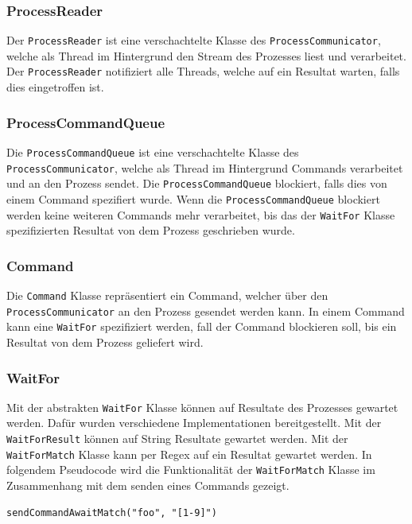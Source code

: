 \subsubsection{ProcessReader}

Der \verb!ProcessReader! ist eine verschachtelte Klasse des \verb!ProcessCommunicator!, welche als Thread im Hintergrund den Stream des Prozesses liest und verarbeitet. Der \verb!ProcessReader! notifiziert alle Threads, welche auf ein Resultat warten, falls dies eingetroffen ist.

\subsubsection{ProcessCommandQueue}

Die \verb!ProcessCommandQueue! ist eine verschachtelte Klasse des \verb!ProcessCommunicator!, welche als Thread im Hintergrund Commands verarbeitet und an den Prozess sendet. Die \verb!ProcessCommandQueue! blockiert, falls dies von einem Command spezifiert wurde. Wenn die \verb!ProcessCommandQueue! blockiert werden keine weiteren Commands mehr verarbeitet, bis das der \verb!WaitFor! Klasse spezifizierten Resultat von dem Prozess geschrieben wurde.

\subsubsection{Command}

Die \verb!Command! Klasse repräsentiert ein Command, welcher über den \verb!ProcessCommunicator! an den Prozess gesendet werden kann. In einem Command kann eine \verb!WaitFor! spezifiziert werden, fall der Command blockieren soll, bis ein Resultat von dem Prozess geliefert wird.

\newpage
\subsubsection{WaitFor}

Mit der abstrakten \verb!WaitFor! Klasse können auf Resultate des Prozesses gewartet werden. Dafür wurden verschiedene Implementationen bereitgestellt. Mit der \verb!WaitForResult! können auf String Resultate gewartet werden. Mit der \verb!WaitForMatch! Klasse kann per Regex auf ein Resultat gewartet werden. In folgendem Pseudocode wird die Funktionalität der \verb!WaitForMatch! Klasse im Zusammenhang mit dem senden eines Commands gezeigt.

\begin{verbatim}
sendCommandAwaitMatch("foo", "[1-9]")
\end{verbatim}

